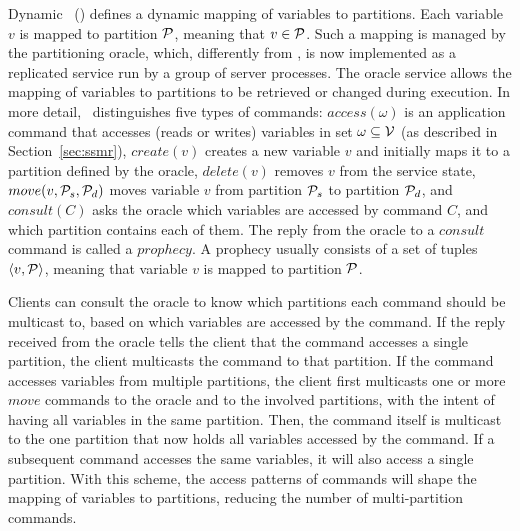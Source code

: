 Dynamic \ssmr\ (\dssmr) defines a dynamic mapping of variables to partitions.
Each variable $v$ is mapped to partition $\mathcal{P}$, meaning that $v \in \mathcal{P}$.
Such a mapping is managed by the partitioning oracle, which, differently from \ssmr, is now implemented as a replicated service run by a group of server processes.
The oracle service allows the mapping of variables to partitions to be retrieved or changed during execution.
In more detail, \dssmr\ distinguishes five types of commands:
$access(\omega)$ is an application command that accesses (reads or writes) variables in set $\omega \subseteq \mathcal{V}$ (as described in Section~\ref{sec:ssmr}),
$create(v)$ creates a new variable $v$ and initially maps it to a partition defined by the oracle,
$delete(v)$ removes $v$ from the service state,
$move(v,\mathcal{P}_s,\mathcal{P}_d)$ moves variable $v$ from partition $\mathcal{P}_s$ to partition $\mathcal{P}_d$,
and $consult(C)$ asks the oracle which variables are accessed by command $C$, and which partition contains each of them.
The reply from the oracle to a $consult$ command is called a $prophecy$.
A prophecy usually consists of a set of tuples $\langle v, \mathcal{P} \rangle$, meaning that variable $v$ is mapped to partition $\mathcal{P}$.


Clients can consult the oracle to know which partitions each command should be multicast to, based on which variables are accessed by the command.
If the reply received from the oracle tells the client that the command accesses a single partition, the client multicasts the command to that partition.
If the command accesses variables from multiple partitions, the client first multicasts one or more $move$ commands to the oracle and to the involved partitions, with the intent of having all variables in the same partition.
Then, the command itself is multicast to the one partition that now holds all variables accessed by the command.
If a subsequent command accesses the same variables, it will also access a single partition.
With this scheme, the access patterns of commands will shape the mapping of variables to partitions, reducing the number of multi-partition commands.

